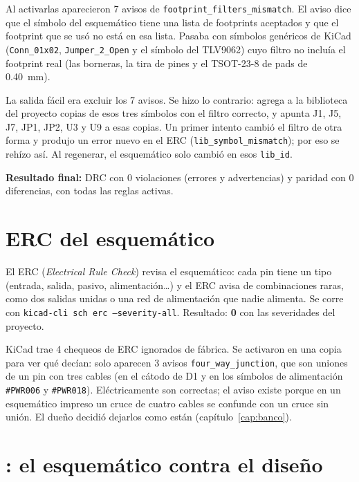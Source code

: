 Al activarlas aparecieron 7 avisos de \texttt{footprint\_filters\_mismatch}. El aviso dice que el símbolo del
esquemático tiene una lista de footprints aceptados y que el footprint que se usó no está en esa lista. Pasaba con
símbolos genéricos de KiCad (\texttt{Conn\_01x02}, \texttt{Jumper\_2\_Open} y el símbolo del TLV9062) cuyo filtro no
incluía el footprint real (las borneras, la tira de pines y el TSOT-23-8 de pads de \SI{0.40}{\milli\meter}).

\begin{ojo}
La salida fácil era excluir los 7 avisos. Se hizo lo contrario:  agrega a la
biblioteca del proyecto copias de esos tres símbolos con el filtro correcto, y  apunta J1,
J5, J7, JP1, JP2, U3 y U9 a esas copias. Un primer intento cambió el filtro de otra forma y produjo un error nuevo en
el ERC (\texttt{lib\_symbol\_mismatch}); por eso se rehízo así. Al regenerar, el esquemático solo cambió en esos
\texttt{lib\_id}.
\end{ojo}

\textbf{Resultado final:} DRC con 0 violaciones (errores y advertencias) y paridad con 0 diferencias, con todas las
reglas activas.

\section{ERC del esquemático}\label{sec:c11-erc}

El ERC (\emph{Electrical Rule Check}) revisa el esquemático: cada pin tiene un tipo (entrada, salida, pasivo,
alimentación\ldots) y el ERC avisa de combinaciones raras, como dos salidas unidas o una red de alimentación que nadie
alimenta. Se corre con \texttt{kicad-cli sch erc --severity-all}. Resultado: \textbf{0} con las severidades del
proyecto.

KiCad trae 4 chequeos de ERC ignorados de fábrica. Se activaron en una copia para ver qué decían: solo aparecen 3
avisos \texttt{four\_way\_junction}, que son uniones de un pin con tres cables (en el cátodo de D1 y en los símbolos de
alimentación \texttt{\#PWR006} y \texttt{\#PWR018}). Eléctricamente son correctas; el aviso existe porque en un
esquemático impreso un cruce de cuatro cables se confunde con un cruce sin unión. El dueño decidió dejarlos como
están (capítulo~\ref{cap:banco}).

\section{\texorpdfstring{}{verify.py}: el esquemático contra el diseño}\label{sec:c11-verify}

